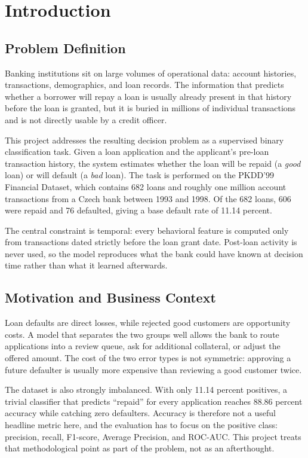 \chapter{Introduction}

\section{Problem Definition}
Banking institutions sit on large volumes of operational data: account histories, transactions, demographics, and loan records. The information that predicts whether a borrower will repay a loan is usually already present in that history before the loan is granted, but it is buried in millions of individual transactions and is not directly usable by a credit officer.

This project addresses the resulting decision problem as a supervised binary classification task. Given a loan application and the applicant's pre-loan transaction history, the system estimates whether the loan will be repaid (a \emph{good} loan) or will default (a \emph{bad} loan). The task is performed on the PKDD'99 Financial Dataset, which contains 682 loans and roughly one million account transactions from a Czech bank between 1993 and 1998. Of the 682 loans, 606 were repaid and 76 defaulted, giving a base default rate of 11.14 percent.

The central constraint is temporal: every behavioral feature is computed only from transactions dated strictly before the loan grant date. Post-loan activity is never used, so the model reproduces what the bank could have known at decision time rather than what it learned afterwards.

\section{Motivation and Business Context}
Loan defaults are direct losses, while rejected good customers are opportunity costs. A model that separates the two groups well allows the bank to route applications into a review queue, ask for additional collateral, or adjust the offered amount. The cost of the two error types is not symmetric: approving a future defaulter is usually more expensive than reviewing a good customer twice.

The dataset is also strongly imbalanced. With only 11.14 percent positives, a trivial classifier that predicts ``repaid'' for every application reaches 88.86 percent accuracy while catching zero defaulters. Accuracy is therefore not a useful headline metric here, and the evaluation has to focus on the positive class: precision, recall, F1-score, Average Precision, and ROC-AUC. This project treats that methodological point as part of the problem, not as an afterthought.

